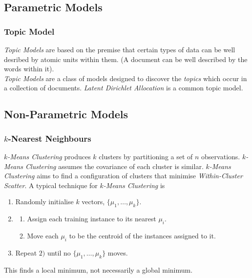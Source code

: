 \documentclass[11pt,a4paper]{article}
\begin{document}
\subsection{Parametric Models}

\subsubsection{Topic Model}

\textit{Topic Models} are based on the premise that certain types of data can be well desribed by atomic units within them. (\ie A document can be well described by the words within it).\\

\textit{Topic Models} are a class of models designed to discover the \textit{topics} which occur in a collection of documents. \textit{Latent Dirichlet Allocation} is a common topic model.\\


\subsection{Non-Parametric Models}

\subsubsection{$k$-Nearest Neighbours}

\textit{$k$-Means Clustering} produces $k$ clusters by partitioning a set of $n$ observations. \textit{$k$-Means Clustering} assumes the covariance of each cluster is similar. \textit{$k$-Means Clustering} aims to find a configuration of clusters that minimise \textit{Within-Cluster Scatter}. A typical technique for \textit{$k$-Means Clustering} is
\begin{enumerate}[label=\arabic*)]
	\item Randomly initialise $k$ vectors, $\{\mu_1,\dots,\mu_k\}$.
	\item
	\begin{enumerate}
		\item Assign each training instance to its nearest $\mu_i$.
		\item Move each $\mu_i$ to be the centroid of the instances assigned to it.
	\end{enumerate}
	\item Repeat $2)$ until no $\{\mu_1,\dots,\mu_k\}$ moves.
\end{enumerate}
\nb This finds a local minimum, not necessarily a global minimum.\\
\end{document}
